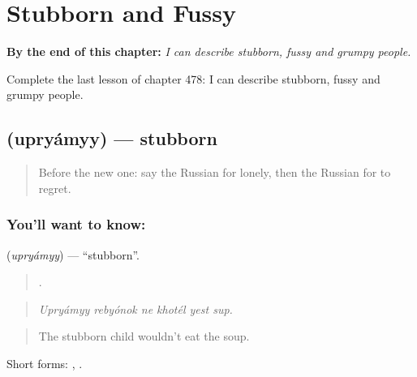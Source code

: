 
\chapter{Stubborn and Fussy}
\label{ch:ru-stubborn-and-fussy}

\begin{chapteropening}
\textbf{By the end of this chapter:} \emph{I can describe stubborn, fussy and grumpy people.}

Complete the last lesson of chapter 478: I can describe stubborn, fussy and grumpy people.
\end{chapteropening}

\section[\texorpdfstring{\ru{упрямый} (upryámyy)}{упрямый (upryámyy)}]{ (upryámyy) — stubborn}

\label{lesson:RU-C478-upryamyy}



\begin{quote}
Before the new one: say the Russian for lonely, then the Russian for to regret.
\end{quote}

\subsection*{You'll want to know: }
\textbf{} (\emph{upryámyy}) — \textquotedblleft{}stubborn\textquotedblright{}.

\begin{quote}
     .
\end{quote}

\begin{quote}
\emph{Upryámyy rebyónok ne khotél yest sup.}
\end{quote}

\begin{quote}
The stubborn child wouldn't eat the soup.
\end{quote}

Short forms: , .

